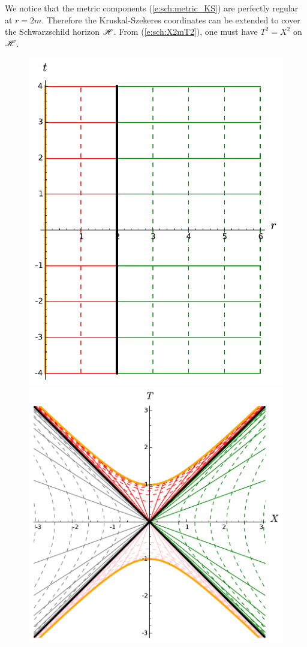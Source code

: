 We notice that the metric components (\ref{e:sch:metric_KS}) are perfectly
regular at $r=2m$. Therefore the Kruskal-Szekeres coordinates can be extended
to cover the Schwarzschild horizon $\mathscr{H}$. From (\ref{e:sch:X2mT2}), one
must have $T^2 = X^2$ on $\mathscr{H}$.

\begin{figure}
\centerline{\includegraphics[height=0.37\textheight]{sch_coord_schwarz.pdf}\qquad
\includegraphics[height=0.37\textheight]{sch_kruskal_diag.pdf}}

\end{figure}

